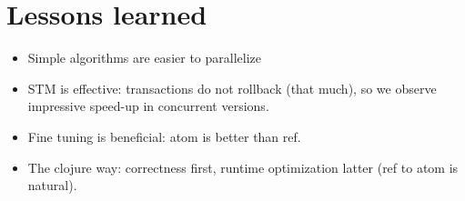 	\section{Lessons learned}
		\begin{itemize}
			\item Simple algorithms are easier to parallelize
			\item STM is effective: transactions do not rollback (that much), so we observe impressive speed-up in concurrent versions.
			\item Fine tuning is beneficial: atom is better than ref.
			\item The clojure way: correctness first, runtime optimization latter (ref to atom is natural).
		\end{itemize}